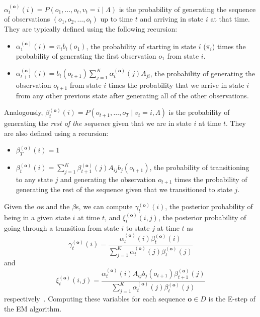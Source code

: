$\alpha^{(\mathbf{o})}_t(i) = P(o_1, \ldots, o_t, v_t = i \mid \Lambda)$ is
the probability of generating the sequence of observations $(o_1, o_2,
\ldots, o_t)$ up to time $t$ and arriving in state $i$ at that time. They
are typically defined using the following recursion:
\begin{itemize}
  \item $\alpha^{(\mathbf{o})}_1(i) = \pi_i b_i(o_1)$, the probability of
    starting in state $i$ ($\pi_i$) times the probability of generating the
    first observation $o_1$ from state $i$.
  \item $\alpha^{(\mathbf{o})}_{t+1}(i) = b_i(o_{t+1})\sum_{j=1}^K
    \alpha^{(\mathbf{o})}_t(j) A_{ji}$, the probability of generating the
    observation $o_{t+1}$ from state $i$ times the probability that we
    arrive in state $i$ from any other previous state after generating all
    of the other observations.
\end{itemize}

Analogously, $\beta^{(\mathbf{o})}_t(i) = P(o_{t+1}, \ldots, o_{T} \mid v_t
= i, \Lambda)$ is the probability of generating the \emph{rest of the
sequence} given that we are in state $i$ at time $t$. They are also defined
using a recursion:
\begin{itemize}
  \item $\beta^{(\mathbf{o})}_T(i) = 1$
  \item $\beta^{(\mathbf{o})}_t(i) = \sum_{j=1}^K
    \beta^{(\mathbf{o})}_{t+1}(j) A_{ij} b_j(o_{t+1})$, the probability of
    transitioning to any state $j$ and generating the observation $o_{t+1}$
    times the probability of generating the rest of the sequence given that
    we transitioned to state $j$.
\end{itemize}

Given the $\alpha$s and the $\beta$s, we can compute
$\gamma^{(\mathbf{o})}_t(i)$, the posterior probability of being in a given
state $i$ at time $t$, and $\xi^{(\mathbf{o})}_t(i,j)$, the posterior
probability of going through a transition from state $i$ to state $j$ at
time $t$ as
\begin{equation}
  \gamma^{(\mathbf{o})}_t(i) =
  \frac{\alpha^{(\mathbf{o})}_t(i)\beta^{(\mathbf{o})}_t(i)}{\sum_{j=1}^K
  \alpha^{(\mathbf{o})}_t(j)\beta^{(\mathbf{o})}_t(j)}
\end{equation}
and
\begin{equation}
  \xi^{(\mathbf{o})}_t(i,j) = \frac{\alpha^{(\mathbf{o})}_t(i) A_{ij}
  b_j(o_{t+1}) \beta^{(\mathbf{o})}_{t+1}(j)} {\sum_{j=1}^K
  \alpha^{(\mathbf{o})}_t(j)\beta^{(\mathbf{o})}_t(j)}
\end{equation}
respectively~\cite{Rabiner:1990:RSR}. Computing these variables for each
sequence $\mathbf{o} \in D$ is the E-step of the EM algorithm.

